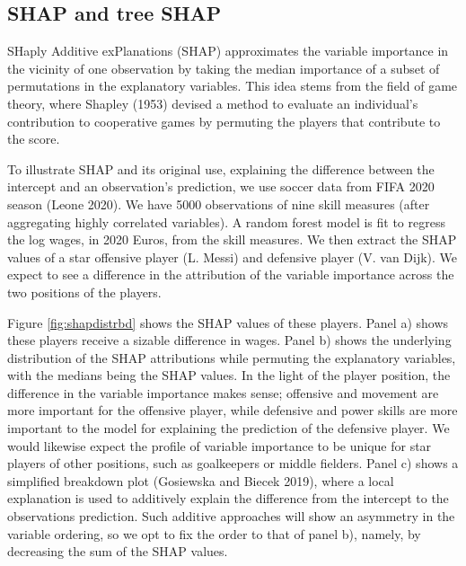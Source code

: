 \documentclass[
  article]{article}
\begin{document}
\hypertarget{shap-and-tree-shap}{%
\subsection{SHAP and tree SHAP}\label{shap-and-tree-shap}}

SHaply Additive exPlanations (SHAP) approximates the variable importance in the vicinity of one observation by taking the median importance of a subset of permutations in the explanatory variables. This idea stems from the field of game theory, where Shapley (1953) devised a method to evaluate an individual's contribution to cooperative games by permuting the players that contribute to the score.

To illustrate SHAP and its original use, explaining the difference between the intercept and an observation's prediction, we use soccer data from FIFA 2020 season (Leone 2020). We have 5000 observations of nine skill measures (after aggregating highly correlated variables). A random forest model is fit to regress the log wages, in 2020 Euros, from the skill measures. We then extract the SHAP values of a star offensive player (L. Messi) and defensive player (V. van Dijk). We expect to see a difference in the attribution of the variable importance across the two positions of the players.

Figure \ref{fig:shapdistrbd} shows the SHAP values of these players. Panel a) shows these players receive a sizable difference in wages. Panel b) shows the underlying distribution of the SHAP attributions while permuting the explanatory variables, with the medians being the SHAP values. In the light of the player position, the difference in the variable importance makes sense; offensive and movement are more important for the offensive player, while defensive and power skills are more important to the model for explaining the prediction of the defensive player. We would likewise expect the profile of variable importance to be unique for star players of other positions, such as goalkeepers or middle fielders. Panel c) shows a simplified breakdown plot (Gosiewska and Biecek 2019), where a local explanation is used to additively explain the difference from the intercept to the observations prediction. Such additive approaches will show an asymmetry in the variable ordering, so we opt to fix the order to that of panel b), namely, by decreasing the sum of the SHAP values.
\end{document}
